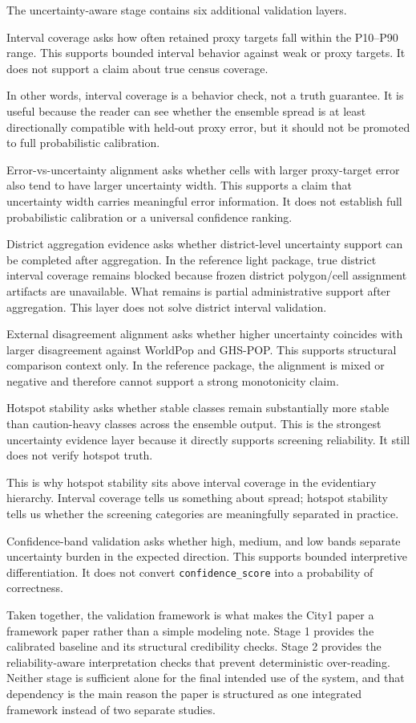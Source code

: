 The uncertainty-aware stage contains six additional validation layers.

Interval coverage asks how often retained proxy targets fall within the P10--P90 range. This supports bounded interval behavior against weak or proxy targets. It does not support a claim about true census coverage.

In other words, interval coverage is a behavior check, not a truth guarantee. It is useful because the reader can see whether the ensemble spread is at least directionally compatible with held-out proxy error, but it should not be promoted to full probabilistic calibration.

Error-vs-uncertainty alignment asks whether cells with larger proxy-target error also tend to have larger uncertainty width. This supports a claim that uncertainty width carries meaningful error information. It does not establish full probabilistic calibration or a universal confidence ranking.

District aggregation evidence asks whether district-level uncertainty support can be completed after aggregation. In the reference light package, true district interval coverage remains blocked because frozen district polygon/cell assignment artifacts are unavailable. What remains is partial administrative support after aggregation. This layer does not solve district interval validation.

External disagreement alignment asks whether higher uncertainty coincides with larger disagreement against WorldPop and GHS-POP. This supports structural comparison context only. In the reference package, the alignment is mixed or negative and therefore cannot support a strong monotonicity claim.

Hotspot stability asks whether stable classes remain substantially more stable than caution-heavy classes across the ensemble output. This is the strongest uncertainty evidence layer because it directly supports screening reliability. It still does not verify hotspot truth.

This is why hotspot stability sits above interval coverage in the evidentiary hierarchy. Interval coverage tells us something about spread; hotspot stability tells us whether the screening categories are meaningfully separated in practice.

Confidence-band validation asks whether high, medium, and low bands separate uncertainty burden in the expected direction. This supports bounded interpretive differentiation. It does not convert \texttt{confidence\_score} into a probability of correctness.

Taken together, the validation framework is what makes the City1 paper a framework paper rather than a simple modeling note. Stage 1 provides the calibrated baseline and its structural credibility checks. Stage 2 provides the reliability-aware interpretation checks that prevent deterministic over-reading. Neither stage is sufficient alone for the final intended use of the system, and that dependency is the main reason the paper is structured as one integrated framework instead of two separate studies.
